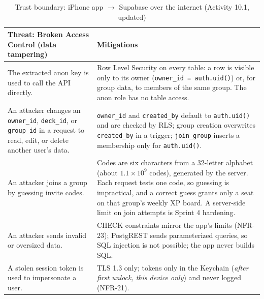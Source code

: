 \documentclass[12pt,letterpaper]{article}
\begin{document}
\begin{table}[H]
\centering
\caption{Trust boundary: iPhone app $\to$ Supabase over the internet (Activity 10.1, updated)}
\label{tab:boundary}
\begin{tabularx}{\textwidth}{@{}Y Y@{}}
\toprule
\textbf{Threat: Broken Access Control (data tampering)} & \textbf{Mitigations} \\
\midrule
The extracted anon key is used to call the API directly. & Row Level Security on every table: a row is visible only to its owner (\texttt{owner\_id = auth.uid()}) or, for group data, to members of the same group. The anon role has no table access. \\
An attacker changes an \texttt{owner\_id}, \texttt{deck\_id}, or \texttt{group\_id} in a request to read, edit, or delete another user's data. & \texttt{owner\_id} and \texttt{created\_by} default to \texttt{auth.uid()} and are checked by RLS; group creation overwrites \texttt{created\_by} in a trigger; \texttt{join\_group} inserts a membership only for \texttt{auth.uid()}. \\
An attacker joins a group by guessing invite codes. & Codes are six characters from a 32-letter alphabet (about $1.1 \times 10^9$ codes), generated by the server. Each request tests one code, so guessing is impractical, and a correct guess grants only a seat on that group's weekly XP board. A server-side limit on join attempts is Sprint 4 hardening. \\
An attacker sends invalid or oversized data. & CHECK constraints mirror the app's limits (NFR-23); PostgREST sends parameterized queries, so SQL injection is not possible; the app never builds SQL. \\
A stolen session token is used to impersonate a user. & TLS 1.3 only; tokens only in the Keychain (\emph{after first unlock, this device only}) and never logged (NFR-21). \\
\bottomrule
\end{tabularx}
\end{table}
\end{document}
